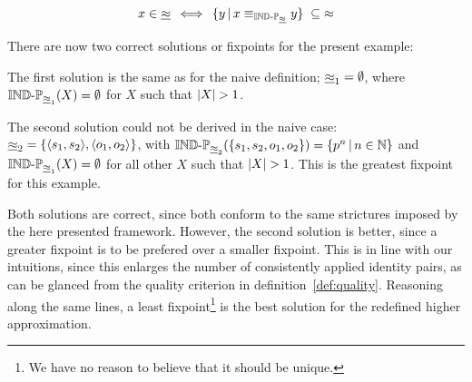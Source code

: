 \begin{definition}
\label{def:identity_lower_approximation_fixpoint}
\begin{align}
  x \in \underline{\approx}
\, \iff \,
    \{y\,\vert\,x \equiv_{\operatorname{{\mathbb{IND}-\mathbb{P}}}_{\underline{\approx}}} y\}
  \; \subseteq \;
    \approx\nonumber
\end{align}
\end{definition}

\noindent There are now two correct solutions or fixpoints
  for the present example:

The first solution is the same as for the naive definition;
  $\underline{\approx}_1 = \emptyset$,
  where $\operatorname{{\mathbb{IND}-\mathbb{P}}}_{\underline{\approx}_1}(X) = \emptyset$
  for $X$ such that $\lvert X\rvert > 1$.

The second solution could not be derived in the naive case:
  $\underline{\approx}_2 = \{\langle s_1,s_2\rangle,\langle o_1,o_2\rangle\}$,
  with $\operatorname{{\mathbb{IND}-\mathbb{P}}}_{\underline{\approx}_2}(\{s_1,s_2,o_1,o_2\}) = \{p^n\,\vert\,n \in \mathbb{N}\}$
  and $\operatorname{{\mathbb{IND}-\mathbb{P}}}_{\underline{\approx}_1}(X) = \emptyset$
  for all other $X$ such that $\lvert X\rvert > 1$.
This is the greatest fixpoint for this example.

Both solutions are correct,
  since both conform to the same strictures imposed by the here presented
  framework.
However, the second solution is better, since a greater fixpoint is
  to be prefered over a smaller fixpoint.
This is in line with our intuitions,
  since this enlarges the number of consistently applied identity pairs,
  as can be glanced from the quality criterion in
  \mbox{definition \ref{def:quality}}.
Reasoning along the same lines,
  a least fixpoint\footnote{
      We have no reason to believe that it should be unique.
    }
  is the best solution for the redefined higher approximation.
